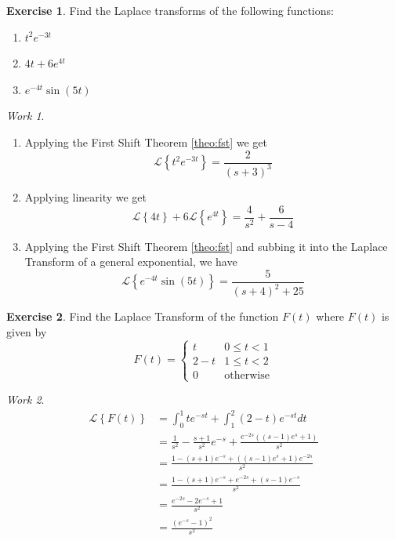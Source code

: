 \documentclass{report}
\theoremstyle{definition}
\newtheorem{exercise}{Exercise}[chapter]
\theoremstyle{remark}
\newtheorem*{work}{Work}
\newcommand{\lapt}[1]{\mathscr{L}\left\{ #1\right\}}
\begin{document}
\begin{exercise}
    Find the Laplace transforms of the following functions: 
    \begin{enumerate}  [label=(\alph*)]
        \item $t^2e^{-3t}$ 
        \item $4t+6e^{4t}$ 
        \item $e^{-4t}\sin(5t)$
    \end{enumerate}
\end{exercise}
\begin{work} 
\leavevmode
    \begin{enumerate}[label=(\alph*)]
        \item Applying the First Shift Theorem \ref{theo:fst} we get
        \begin{equation*}
            \lapt{t^2e^{-3t}} = \frac{2}{(s+3)^3}
        \end{equation*}
        \item Applying linearity we get
        \begin{equation*}
            \lapt{4t}+6\lapt{e^{4t}} = \frac{4}{s^2}+\frac{6}{s-4}
        \end{equation*}
        \item Applying the First Shift Theorem \ref{theo:fst} and subbing it into the Laplace Transform of a general exponential, we have 
        \begin{equation*}
            \lapt{e^{-4t}\sin (5t)} = \frac{5}{(s+4)^2+25}
        \end{equation*}
    \end{enumerate}
\end{work}

\begin{exercise}
    Find the Laplace Transform of the function $F(t)$ where $F(t)$ is given by 
    \begin{equation*}
        F(t) = \begin{cases}
            t &0\leq t< 1 \\
            2-t & 1 \leq t<2\\
            0 & \text{otherwise}
        \end{cases}
    \end{equation*}
\end{exercise}
\begin{work}
\begin{equation*}
    \begin{split}
        \lapt{F(t)} &= \int^1_0te^{-st} + \int^2_1 (2-t)e^{-st}dt \\
        &= \frac{1}{s^2} - \frac{s+1}{s^2}e^{-s} + \frac{e^{-2s}((s-1)e^s+1)}{s^2} \\
        &=\frac{1-(s+1)e^{-s}+((s-1)e^s+1)e^{-2s}}{s^2}\\
        &=\frac{1-(s+1)e^{-s}+e^{-2s}+(s-1)e^{-s}}{s^2}\\ 
        &= \frac{e^{-2s}-2e^{-s}+1}{s^2}\\
        &=\frac{(e^{-s}-1)^2}{s^2}
    \end{split}
\end{equation*}
\end{work}
\end{document}
